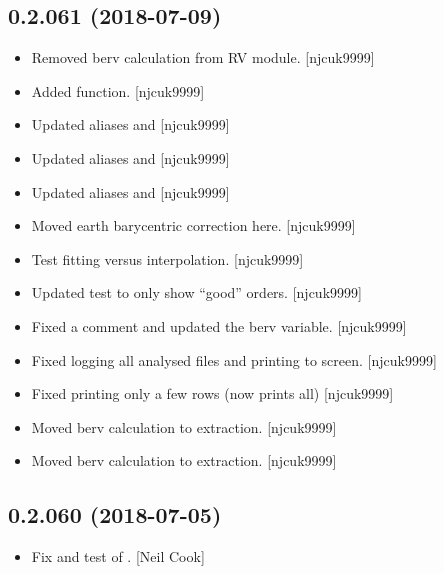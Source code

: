 \documentclass[a4paper,10pt,english]{report}
\begin{document}
\subsection{0.2.061 (2018-07-09)}
\label{\detokenize{misc/changelog:id398}}\begin{itemize}
\item {} 
Removed berv calculation from RV module. {[}njcuk9999{]}

\item {} 
Added  function. {[}njcuk9999{]}

\item {} 
Updated aliases and  {[}njcuk9999{]}

\item {} 
Updated aliases and  {[}njcuk9999{]}

\item {} 
Updated aliases and  {[}njcuk9999{]}

\item {} 
Moved earth barycentric correction here. {[}njcuk9999{]}

\item {} 
Test fitting versus interpolation. {[}njcuk9999{]}

\item {} 
Updated test to only show “good” orders. {[}njcuk9999{]}

\item {} 
Fixed a comment and updated the berv variable. {[}njcuk9999{]}

\item {} 
Fixed logging all analysed files and printing to screen. {[}njcuk9999{]}

\item {} 
Fixed  printing only a few rows (now prints all)
{[}njcuk9999{]}

\item {} 
Moved berv calculation to extraction. {[}njcuk9999{]}

\item {} 
Moved berv calculation to extraction. {[}njcuk9999{]}

\end{itemize}


\subsection{0.2.060 (2018-07-05)}
\label{\detokenize{misc/changelog:id399}}\begin{itemize}
\item {} 
Fix and test of . {[}Neil Cook{]}

\end{itemize}
\end{document}
